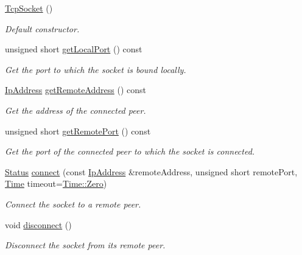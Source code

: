\begin{DoxyCompactItemize}
\item 
\hypertarget{classsf_1_1_tcp_socket_a62a9bf81fd7f15fedb29fd1348483236}{\hyperlink{classsf_1_1_tcp_socket_a62a9bf81fd7f15fedb29fd1348483236}{Tcp\+Socket} ()}\label{classsf_1_1_tcp_socket_a62a9bf81fd7f15fedb29fd1348483236}

\begin{DoxyCompactList}\small\item\em Default constructor. \end{DoxyCompactList}\item 
unsigned short \hyperlink{classsf_1_1_tcp_socket_ab47eeb1cb71f2f251a83bc823773f1b3}{get\+Local\+Port} () const 
\begin{DoxyCompactList}\small\item\em Get the port to which the socket is bound locally. \end{DoxyCompactList}\item 
\hyperlink{classsf_1_1_ip_address}{Ip\+Address} \hyperlink{classsf_1_1_tcp_socket_a7904ca6ab9e018021e305a3aeb7a1b9a}{get\+Remote\+Address} () const 
\begin{DoxyCompactList}\small\item\em Get the address of the connected peer. \end{DoxyCompactList}\item 
unsigned short \hyperlink{classsf_1_1_tcp_socket_abc05220e06f1522144cecab822e79296}{get\+Remote\+Port} () const 
\begin{DoxyCompactList}\small\item\em Get the port of the connected peer to which the socket is connected. \end{DoxyCompactList}\item 
\hyperlink{classsf_1_1_socket_a51bf0fd51057b98a10fbb866246176dc}{Status} \hyperlink{classsf_1_1_tcp_socket_a68cd42d5ab70ab54b16787f555951c40}{connect} (const \hyperlink{classsf_1_1_ip_address}{Ip\+Address} \&remote\+Address, unsigned short remote\+Port, \hyperlink{classsf_1_1_time}{Time} timeout=\hyperlink{classsf_1_1_time_a8db127b632fa8da21550e7282af11fa0}{Time\+::\+Zero})
\begin{DoxyCompactList}\small\item\em Connect the socket to a remote peer. \end{DoxyCompactList}\item 
void \hyperlink{classsf_1_1_tcp_socket_ac18f518a9be3d6be5e74b9404c253c1e}{disconnect} ()
\begin{DoxyCompactList}\small\item\em Disconnect the socket from its remote peer. \end{DoxyCompactList}\item 

\end{DoxyCompactItemize}
